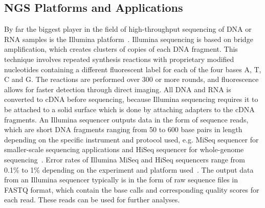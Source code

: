 \subsection{NGS Platforms and Applications}
By far the biggest player in the field of high-throughput sequencing of \ac{DNA} or \ac{RNA} samples is the Illumina platform~\cite{illumina2015introduction}. Illumina sequencing is based on bridge amplification, which creates clusters of copies of each \ac{DNA} fragment. This technique involves repeated synthesis reactions with proprietary modified nucleotides containing a different fluorescent label for each of the four bases A, T, C and G. The reactions are performed over 300 or more rounds, and fluorescence allows for faster detection through direct imaging. All \ac{DNA} and \ac{RNA} is converted to \ac{cDNA} before sequencing, because Illumina sequencing requires it to be attached to a solid surface which is done by attaching adapters to the \ac{cDNA} fragments. An Illumina sequencer outputs data in the form of sequence reads, which are short \ac{DNA} fragments ranging from 50 to 600 base pairs in length depending on the specific instrument and protocol used, e.g. MiSeq sequencer for smaller-scale sequencing applications and HiSeq sequencer for whole-genome sequencing~\cite{illumina2015introduction, slatko2018overview, mardis2008next}. Error rates of Illumina MiSeq and HiSeq sequencers range from 0.1\% to 1\% depending on the experiment and platform used~\cite{illumina2015introduction}. The output data from an Illumina sequencer typically is in the form of raw sequence files in FASTQ format, which contain the base calls and corresponding quality scores for each read. These reads can be used for further analyses.

